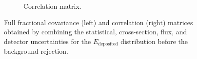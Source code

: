 \begin{figure}[htbp]
\begin{center}
\begin{subfigure}{0.49\textwidth}
      \caption{Correlation matrix.} \label{fig:corr_tot}
    \end{subfigure}
    \caption{Full fractional covariance (left) and correlation (right) matrices obtained by combining the statistical, cross-section, flux, and detector uncertainties for the $E_{\mathrm{deposited}}$ distribution before the background rejection.} \label{fig:sys_tot}
	\end{center}
\end{figure}